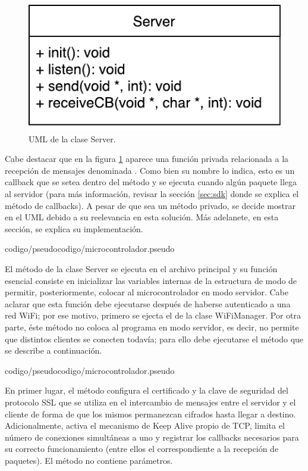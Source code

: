 \begin{figure}[!ht]
	\centering
	\includegraphics[scale=0.8]{imagenes/uml/server.pdf}
	\caption{UML de la clase Server.}
	\label{uml:server}
\end{figure}

Cabe destacar que en la figura \ref{uml:server} aparece una función privada relacionada a la recepción de mensajes denominada .
Como bien su nombre lo indica, esto es un callback que se setea dentro del método  y se ejecuta cuando algún paquete llega al servidor (para más información, revisar la sección \ref{sec:sdk} donde se explica el método de callbacks).
A pesar de que sea un método privado, se decide mostrar en el UML debido a su reelevancia en esta solución.
Más adelanete, en esta sección, se explica su implementación.

 {codigo/pseudocodigo/microcontrolador.pseudo}

El método  de la clase Server se ejecuta en el archivo principal y su función esencial consiste en inicializar las variables internas de la estructura de modo de permitir, posteriormente, colocar al microcontrolador en modo servidor.
Cabe aclarar que esta función debe ejecutarse después de haberse autenticado a una red WiFi; por ese motivo, primero se ejecta el  de la clase WiFiManager.
Por otra parte, éste método no coloca al programa en modo servidor, es decir, no permite que distintos clientes se conecten todavía; para ello debe ejecutarse el método  que se describe a continuación.

 {codigo/pseudocodigo/microcontrolador.pseudo}

En primer lugar, el método  configura el certificado y la clave de seguridad del protocolo SSL que se utiliza en el intercambio de mensajes entre el servidor y el cliente de forma de que los mismos permanezcan cifrados hasta llegar a destino.
Adicionalmente, activa el mecanismo de Keep Alive propio de TCP, limita el número de conexiones simultáneas a uno y registrar los callbacks necesarios para su correcto funcionamiento (entre ellos el correspondiente a la recepción de paquetes).
El método no contiene parámetros.

